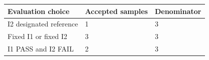 \begin{tabular}{lll}
\toprule
Evaluation choice & Accepted samples & Denominator \\
\midrule
I2 designated reference & 1 & 3 \\
Fixed I1 or fixed I2 & 3 & 3 \\
I1 PASS and I2 FAIL & 2 & 3 \\
\bottomrule
\end{tabular}
